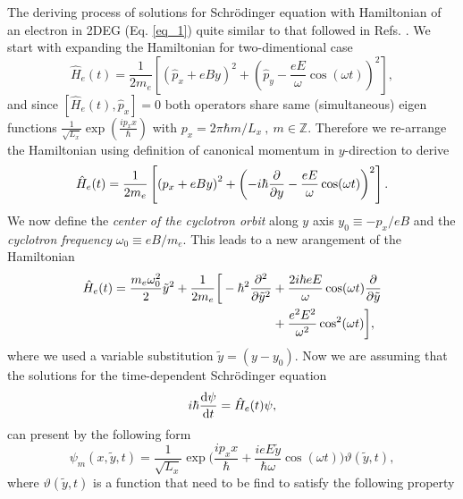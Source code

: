 The deriving process of solutions for Schrödinger equation with Hamiltonian of an electron in 2DEG (Eq. \ref{eq_1}) quite similar to that followed in Refs. \cite{husmi53,dini16}. We start with expanding the Hamiltonian for two-dimentional case
\begin{equation} \label{eq_a1}
  \hat{H}_e(t) = \frac{1}{2m_e}\left[
    \left(\hat{p}_x + eBy \right)^2 +
    \left(\hat{p}_y - \frac{eE}{\omega}\cos(\omega t)\right)^2
  \right],
\end{equation}
and since $\left[\hat{H}_e(t),\hat{p}_x \right] =0$ both operators share same (simultaneous) eigen functions
$\frac{1}{\sqrt{L_x}}\exp(\frac{ip_x x}{\hbar})$ with $p_x = 2\pi \hbar m/L_x~,~ m \in \mathbb{Z}$.
Therefore we re-arrange the Hamiltonian using definition of canonical momentum in $y$-direction to derive
\begin{equation} \label{eq_a2}
    \hat{H}_e(t) = \frac{1}{2m_e}\left[
      \left({p}_x + eBy \right)^2 +
      \left(-i\hbar \pdv{y}- \frac{eE}{\omega}\cos(\omega t)\right)^2
    \right].
\end{equation}
We now define the \textit{center of the cyclotron orbit} along $y$ axis $y_0 \equiv {-p_x}/{eB}$ and the \textit{cyclotron frequency} $\omega_0 \equiv {eB}/{m_e}$. This leads to a new arangement of the Hamiltonian
\begin{equation} \label{eq_a3}
  \begin{aligned}
    \hat{H}_e(t) =
      \frac{m_e \omega_0^2}{2}\tilde{y}^2 +
      \frac{1}{2m_e}\bigg[
      -\hbar^2 \pdv[2]{\tilde{y}} & +
      \frac{2i\hbar eE}{\omega}\cos(\omega t) \pdv{\tilde{y}} \\
      & +
      \frac{e^2E^2}{\omega^2}\cos[2](\omega t)
      \bigg],
  \end{aligned}
\end{equation}
where we used a variable substitution $\tilde{y} = (y - y_0)$. Now we are assuming that the solutions for the time-dependent Schrödinger equation
\begin{equation} \label{eq_a4}
    i \hbar \dv{\psi}{t} = \hat{H}_e(t)\psi,
\end{equation}
can present by the following form
\begin{equation} \label{eq_a5}
    \psi_m(x,\tilde{y},t) = \frac{1}{\sqrt{L_x}} \exp\bigg(
      \frac{ip_x x}{\hbar} +
      \frac{ieE\tilde{y}}{\hbar \omega}\cos(\omega t)
    \bigg) \vartheta(\tilde{y},t),
\end{equation}
where $\vartheta(\tilde{y},t)$ is a function that need to be find to satisfy the following property
